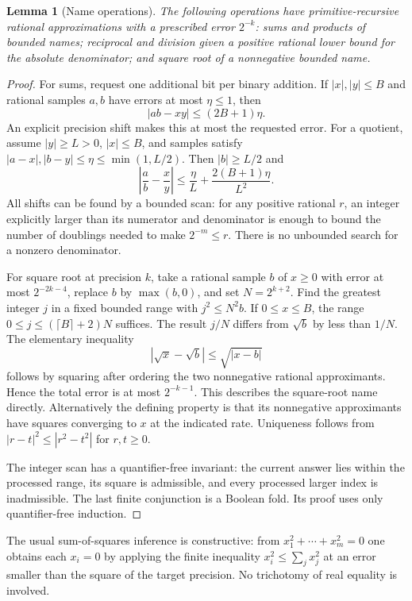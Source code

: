 \documentclass[11pt]{article}
\newtheorem{lemma}[theorem]{Lemma}
\theoremstyle{definition}\newtheorem{definition}[theorem]{Definition}
\begin{document}
\begin{lemma}[Name operations]\label{lem:operations}
The following operations have primitive-recursive rational approximations
with a prescribed error $2^{-k}$: sums and products of bounded names;
reciprocal and division given a positive rational lower bound for the
absolute denominator; and square root of a nonnegative bounded name.
\end{lemma}
\begin{proof}
For sums, request one additional bit per binary addition. If $|x|,|y|\le B$
and rational samples $a,b$ have errors at most $\eta\le1$, then
\[
 |ab-xy|\le(2B+1)\eta.
\]
An explicit precision shift makes this at most the requested error.
For a quotient, assume $|y|\ge L>0$, $|x|\le B$, and samples satisfy
$|a-x|,|b-y|\le\eta\le\min(1,L/2)$. Then $|b|\ge L/2$ and
\begin{equation}\label{eq:division-error}
 \left|\frac ab-\frac xy\right|
 \le\frac\eta L+\frac{2(B+1)\eta}{L^2}.
\end{equation}
All shifts can be found by a bounded scan: for any positive rational
$r$, an integer explicitly larger than its numerator and denominator is
enough to bound the number of doublings needed to make $2^{-m}\le r$.
There is no unbounded search for a nonzero denominator.

For square root at precision $k$, take a rational sample $b$ of $x\ge0$
with error at most $2^{-2k-4}$, replace $b$ by $\max(b,0)$, and set
$N=2^{k+2}$. Find the greatest integer $j$ in a fixed bounded range with
$j^2\le N^2b$. If $0\le x\le B$, the range
$0\le j\le (\lceil B\rceil+2)N$ suffices. The result $j/N$ differs from
$\sqrt b$ by less than $1/N$. The elementary inequality
\[
 |\sqrt x-\sqrt b|\le\sqrt{|x-b|}
\]
follows by squaring after ordering the two nonnegative rational
approximants. Hence the total error is at most $2^{-k-1}$.
This describes the square-root name directly. Alternatively the defining
property is that its nonnegative approximants have squares converging to
$x$ at the indicated rate. Uniqueness follows from
$|r-t|^2\le|r^2-t^2|$ for $r,t\ge0$.

The integer scan has a quantifier-free invariant: the current answer lies
within the processed range, its square is admissible, and every processed
larger index is inadmissible. The last finite conjunction is a Boolean
fold. Its proof uses only quantifier-free induction.
\end{proof}

The usual sum-of-squares inference is constructive: from
$x_1^2+\cdots+x_m^2=0$ one obtains each $x_i=0$ by applying the finite
inequality $x_i^2\le\sum_j x_j^2$ at an error smaller than the square of
the target precision. No trichotomy of real equality is involved.
\end{document}

